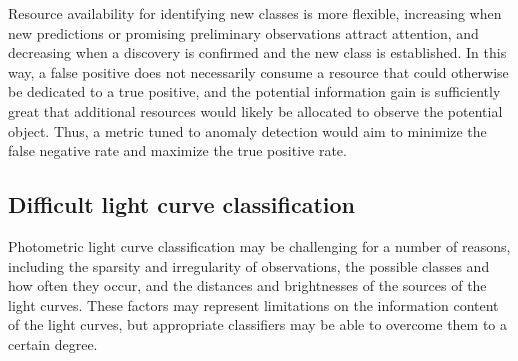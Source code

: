 Resource availability for identifying new classes is more flexible, increasing when new predictions or promising preliminary observations attract attention, and decreasing when a discovery is confirmed and the new class is established.
In this way, a false positive does not necessarily consume a resource that could otherwise be dedicated to a true positive, and the potential information gain is sufficiently great that additional resources would likely be allocated to observe the potential object.
Thus, a metric tuned to anomaly detection would aim to minimize the false negative rate and maximize the true positive rate.

%

\subsection{Difficult light curve classification}
\label{sec:difficult}

Photometric light curve classification may be challenging for a number of reasons, including the sparsity and irregularity of observations, the possible classes and how often they occur, and the distances and brightnesses of the sources of the light curves.
These factors may represent limitations on the information content of the light curves, but appropriate classifiers may be able to overcome them to a certain degree.

